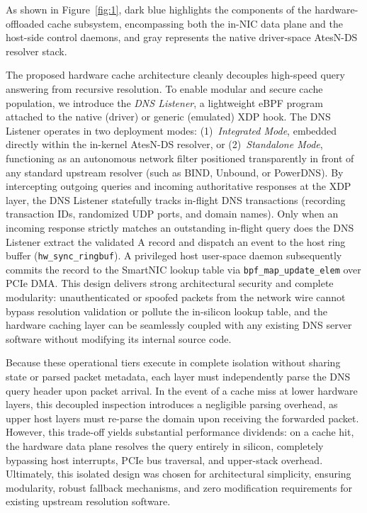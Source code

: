 \documentclass[a4paper,fleqn,colorlinks,hidelinks]{cas-sc}
\begin{document}
As shown in Figure~\ref{fig:1}, dark blue highlights the components of the hardware-offloaded cache subsystem, encompassing both the in-NIC data plane and the host-side control daemons, and gray represents the native driver-space AtesN-DS resolver stack.

The proposed hardware cache architecture cleanly decouples high-speed query answering from recursive resolution. To enable modular and secure cache population, we introduce the \textit{DNS Listener}, a lightweight eBPF program attached to the native (driver) or generic (emulated) XDP hook. The DNS Listener operates in two deployment modes: (1)~\textit{Integrated Mode}, embedded directly within the in-kernel AtesN-DS resolver, or (2)~\textit{Standalone Mode}, functioning as an autonomous network filter positioned transparently in front of any standard upstream resolver (such as BIND, Unbound, or PowerDNS). By intercepting outgoing queries and incoming authoritative responses at the XDP layer, the DNS Listener statefully tracks in-flight DNS transactions (recording transaction IDs, randomized UDP ports, and domain names). Only when an incoming response strictly matches an outstanding in-flight query does the DNS Listener extract the validated A record and dispatch an event to the host ring buffer (\texttt{hw\_sync\_ringbuf}). A privileged host user-space daemon subsequently commits the record to the SmartNIC lookup table via \texttt{bpf\_map\_update\_elem} over PCIe DMA. This design delivers strong architectural security and complete modularity: unauthenticated or spoofed packets from the network wire cannot bypass resolution validation or pollute the in-silicon lookup table, and the hardware caching layer can be seamlessly coupled with any existing DNS server software without modifying its internal source code.

Because these operational tiers execute in complete isolation without sharing state or parsed packet metadata, each layer must independently parse the DNS query header upon packet arrival. In the event of a cache miss at lower hardware layers, this decoupled inspection introduces a negligible parsing overhead, as upper host layers must re-parse the domain upon receiving the forwarded packet. However, this trade-off yields substantial performance dividends: on a cache hit, the hardware data plane resolves the query entirely in silicon, completely bypassing host interrupts, PCIe bus traversal, and upper-stack overhead. Ultimately, this isolated design was chosen for architectural simplicity, ensuring modularity, robust fallback mechanisms, and zero modification requirements for existing upstream resolution software.
\end{document}

